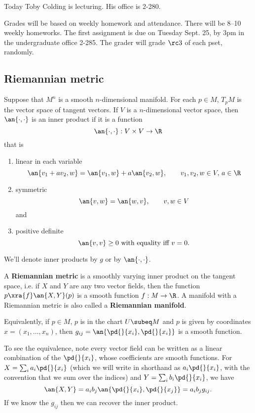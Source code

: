 Today Toby Colding is lecturing. His office is 2-280.

Grades will be based on weekly homework and attendance. There will be 8--10 weekly homeworks. The first assignment is due on Tuesday Sept. 25, by 3pm in the undergraduate office 2-285. The grader will grade $\rc3$ of each pset, randomly.

\subsection{Riemannian metric}

Suppose that $M^n$ is a smooth $n$-dimensional manifold. For each $p\in M$, $T_pM$ is the vector space of tangent vectors. If $V$ is a $n$-dimensional vector space, then $\an{\cdot,\cdot}$ is an inner product if it is a function
\[
\an{\cdot,\cdot}:V\times V\to \R
\]
that is 
\begin{enumerate}
\item
linear in each variable
\[
\an{v_1+av_2,w}=\an{v_1,w}+a\an{v_2,w},\qquad v_1,v_2,w\in V,\,a\in \R
\]
\item symmetric
\[
\an{v,w}=\an{w,v},\qquad v,w\in V
\]
and
\item positive definite
\[
\an{v,v}\ge 0\text{ with equality iff }v=0.
\]
\end{enumerate}
We'll denote inner products by $g$ or by $\an{\cdot,\cdot}$.
\begin{df}
A \textbf{Riemannian metric} is a smoothly varying inner product on the tangent space, i.e. if $X$ and $Y$ are any two vector fields, then the function $p\xra{f}\an{X,Y}(p)$ is a smooth function $f:M\to \R$. A manifold with a Riemannian  metric is also called a \textbf{Riemannian manifold}.
\end{df}
Equivalently, if $p\in M$, $p$ is in the chart $U\subeq M$ and $p$ is given by coordinates $x=(x_1,\ldots, x_n)$, then $g_{ij}=\an{\pd{}{x_i},\pd{}{x_i}}$ is a smooth function. 

To see the equivalence, note every vector field can be written as a linear combination of the $\pd{}{x_i}$, whose coefficients are smooth functions. For $X=\sum_i a_i\pd{}{x_i}$ (which we will write in shorthand as $a_i\pd{}{x_i}$, with the convention that we sum over the indices) and $Y=\sum_i b_i\pd{}{x_i}$, we have
\[
\an{X,Y}=a_ib_j\an{\pd{}{x_i},\pd{}{x_j}}=a_ib_jg_{ij}.
\]
If we know the $g_{ij}$ then we can recover the inner product.

